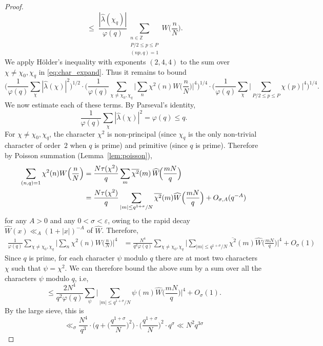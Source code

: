 \documentclass[11pt]{amsart}
\begin{document}
\begin{proof}
\[\;\leq\;
\frac{|\widehat{\lambda}(\chi_q)|}{\varphi(q)}
\sum_{\substack{n \in \mathbb{Z} \\ P/2 \leq p \leq P \\ (np,q)=1}} W \Big ( \frac{n}{N} \Big ).
\]
We apply H\"older's inequality with exponents $(2,4,4)$ to the sum
over $\chi \neq \chi_0, \chi_q$ in \eqref{eq:char_expand}. Thus it remains to
bound 
$$
\Big ( \frac{1}{\varphi(q)} \sum_{\chi} |\widehat{\lambda}(\chi)|^2 \Big )^{1/2} \cdot 
\Big ( \frac{1}{\varphi(q)} \sum_{\chi \neq \chi_0, \chi_q} \Big | \sum_{n} \chi^2(n) W \Big ( \frac{n}{N} \Big ) \Big |^4 \Big )^{1/4} \cdot \Big ( \frac{1}{\varphi(q)} \sum_{\chi} \Big | \sum_{P/2 \leq p \leq P} \chi(p) \Big |^4 \Big )^{1/4}. 
$$
We now estimate each of these terms. 
By Parseval's identity, 
$$
\frac{1}{\varphi(q)} \sum_{\chi} |\widehat{\lambda}(\chi)|^2
= \varphi(q) \leq q.
$$
For $\chi \neq \chi_0, \chi_q$, the character $\chi^2$ is non-principal
(since $\chi_q$ is the only non-trivial character of order~$2$
when $q$ is prime) and primitive (since $q$ is prime).
Therefore by Poisson summation (Lemma~\ref{lem:poisson}),
\begin{align*}
\sum_{\substack{(n,q)=1}} \chi^2(n) W \Big ( \frac{n}{N} \Big )
& =
\frac{N \tau(\chi^2)}{q}
\sum_{m} \overline{\chi^2}(m)\,
\widehat{W}\!\Bigl(\frac{mN}{q}\Bigr) \\ & = \frac{N \tau(\chi^2)}{q} \sum_{|m| \leq q^{1 + \sigma} / N} \overline{\chi^2}(m) \widehat{W} \Big ( \frac{m N}{q} \Big ) + O_{\sigma, A} (q^{-A})
\end{align*}
for any $A > 0$ and any $0 < \sigma < \varepsilon$, owing to the rapid decay $\widehat{W}(x) \ll_{A} (1 + |x|)^{-A}$ of $\widehat{W}$.
Therefore, 
\begin{align*}
\frac{1}{\varphi(q)} \sum_{\chi \neq \chi_0, \chi_q} \Big | \sum_{n} \chi^2(n) W \Big ( \frac{n}{N} \Big ) \Big |^4  & = \frac{N^4}{q^2 \varphi(q)} \sum_{\chi \neq \chi_0, \chi_q} \Big | \sum_{|m| \leq q^{1 + \sigma} / N} \overline{\chi^2}(m) \widehat{W} \Big ( \frac{m N}{q} \Big ) \Big |^4 + O_\sigma(1) 
\end{align*}
Since $q$ is prime, for each character $\psi$ modulo $q$ there are at most two characters $\chi$ such that $\psi = \chi^2$.   We can therefore bound the above sum by a sum over all the characters $\psi$ modulo $q$, i.e, 
$$
\leq \frac{2 N^4}{q^2 \varphi(q)} \sum_{\psi} \Big | \sum_{|m| \leq q^{1 + \sigma} / N} \psi(m) \widehat{W} \Big ( \frac{m N}{q} \Big ) \Big |^4 + O_\sigma(1). 
$$
By the large sieve, this is 
$$
\ll_\sigma \frac{N^4}{q^3} \cdot \Big ( q + \Big ( \frac{q^{1 + \sigma}}{N} \Big )^2 \Big ) \cdot \Big ( \frac{q^{1 + \sigma}}{N} \Big )^2  \cdot q^{\sigma} \ll N^2 q^{3 \sigma}
$$
\end{proof}
\end{document}
